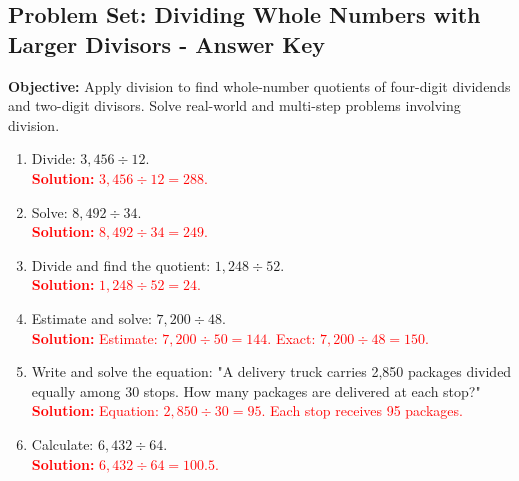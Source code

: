 \documentclass[12pt]{article}
\title{}
\date{}
\begin{document}
\subsection*{Problem Set: Dividing Whole Numbers with Larger Divisors - Answer Key}
\onehalfspacing

\begin{tcolorbox}[colframe=black!40, colback=gray!5, 
coltitle=black, colbacktitle=black!20, fonttitle=\bfseries\Large, 
title=Learning Objective, halign title=center, left=5pt, right=5pt, top=5pt, bottom=15pt]
\textbf{Objective:} Apply division to find whole-number quotients of four-digit dividends and two-digit divisors. Solve real-world and multi-step problems involving division.
\end{tcolorbox}

\begin{tcolorbox}[colframe=black!60, colback=white, 
coltitle=black, colbacktitle=black!15, fonttitle=\bfseries\Large, 
title=Exercises, halign title=center, left=10pt, right=10pt, top=10pt, bottom=60pt]
\begin{enumerate}[itemsep=3em]
    \item Divide: \( 3,456 \div 12 \).\\
    \textcolor{red}{\textbf{Solution:} \( 3,456 \div 12 = 288 \).}

    \item Solve: \( 8,492 \div 34 \).\\
    \textcolor{red}{\textbf{Solution:} \( 8,492 \div 34 = 249 \).}

    \item Divide and find the quotient: \( 1,248 \div 52 \).\\
    \textcolor{red}{\textbf{Solution:} \( 1,248 \div 52 = 24 \).}

    \item Estimate and solve: \( 7,200 \div 48 \).\\
    \textcolor{red}{\textbf{Solution:} Estimate: \( 7,200 \div 50 = 144 \). Exact: \( 7,200 \div 48 = 150 \).}

    \item Write and solve the equation: "A delivery truck carries 2,850 packages divided equally among 30 stops. How many packages are delivered at each stop?"\\
    \textcolor{red}{\textbf{Solution:} Equation: \( 2,850 \div 30 = 95 \). Each stop receives 95 packages.}

    \item Calculate: \( 6,432 \div 64 \).\\
    \textcolor{red}{\textbf{Solution:} \( 6,432 \div 64 = 100.5 \).}


\end{enumerate}
\end{tcolorbox}
\end{document}
